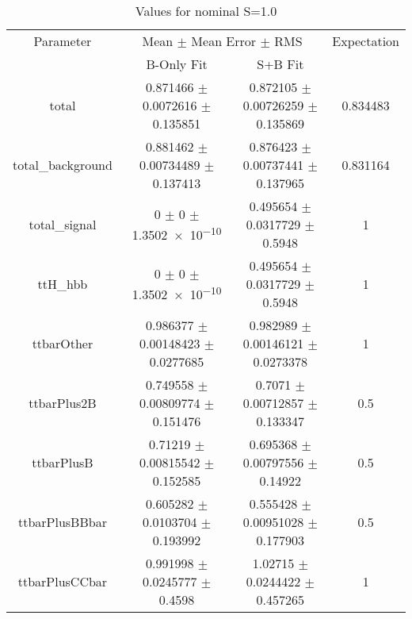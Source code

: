 \begin{table}
\centering
\caption{Values for nominal S=1.0}
\begin{tabular}{cccc}
\toprule
Parameter & \multicolumn{2}{c}{Mean $\pm$ Mean Error $\pm$ RMS} & Expectation\\
 & B-Only Fit & S+B Fit & \\
\midrule
total & \num{0.871466} $\pm$ \num{0.0072616} $\pm$ \num{0.135851} & \num{0.872105} $\pm$ \num{0.00726259} $\pm$ \num{0.135869} & \num{0.834483}\\
total\_background & \num{0.881462} $\pm$ \num{0.00734489} $\pm$ \num{0.137413} & \num{0.876423} $\pm$ \num{0.00737441} $\pm$ \num{0.137965} & \num{0.831164}\\
total\_signal & \num{0} $\pm$ \num{0} $\pm$ \num{1.3502e-10} & \num{0.495654} $\pm$ \num{0.0317729} $\pm$ \num{0.5948} & \num{1}\\
ttH\_hbb & \num{0} $\pm$ \num{0} $\pm$ \num{1.3502e-10} & \num{0.495654} $\pm$ \num{0.0317729} $\pm$ \num{0.5948} & \num{1}\\
ttbarOther & \num{0.986377} $\pm$ \num{0.00148423} $\pm$ \num{0.0277685} & \num{0.982989} $\pm$ \num{0.00146121} $\pm$ \num{0.0273378} & \num{1}\\
ttbarPlus2B & \num{0.749558} $\pm$ \num{0.00809774} $\pm$ \num{0.151476} & \num{0.7071} $\pm$ \num{0.00712857} $\pm$ \num{0.133347} & \num{0.5}\\
ttbarPlusB & \num{0.71219} $\pm$ \num{0.00815542} $\pm$ \num{0.152585} & \num{0.695368} $\pm$ \num{0.00797556} $\pm$ \num{0.14922} & \num{0.5}\\
ttbarPlusBBbar & \num{0.605282} $\pm$ \num{0.0103704} $\pm$ \num{0.193992} & \num{0.555428} $\pm$ \num{0.00951028} $\pm$ \num{0.177903} & \num{0.5}\\
ttbarPlusCCbar & \num{0.991998} $\pm$ \num{0.0245777} $\pm$ \num{0.4598} & \num{1.02715} $\pm$ \num{0.0244422} $\pm$ \num{0.457265} & \num{1}\\
\bottomrule
\end{tabular}
\end{table}